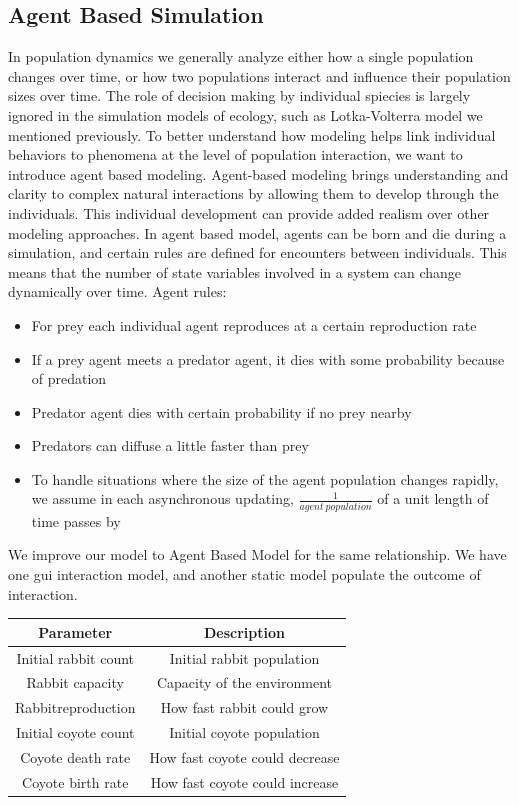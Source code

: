 \documentclass{article}
\begin{document}
\begin{normalsize}
		\subsection{Agent Based Simulation}
		In population dynamics we generally analyze either how a single population changes over time, or how two populations interact and influence their population sizes over time. The role of decision making by individual spiecies is largely ignored in the simulation models of ecology, such as Lotka-Volterra model we mentioned previously. To better understand how modeling helps link individual behaviors to phenomena at the level of population interaction, we want to  introduce agent based modeling.
		 Agent-based modeling brings understanding and clarity to complex natural interactions by allowing them to develop through the individuals. This individual development can provide added realism over other modeling approaches. In agent based model,
		agents can be born and die during a simulation, and certain rules are defined for encounters between individuals. This means that the number of state variables involved in a system can change dynamically over time.
		Agent rules:
		\begin{itemize}
		    \item For prey each individual agent reproduces at a certain reproduction rate
		    \item If a prey agent meets a predator agent, it dies with some probability because of predation
		    \item Predator agent  dies with certain probability if no prey nearby
		    \item Predators can diffuse a little faster than prey
		    \item To handle situations where the size of the agent population changes rapidly, we assume in each asynchronous updating,
$\frac{1}{agent\ population}$ of a unit length of time passes by
		\end{itemize}
		
		We improve our model to Agent Based Model for the same relationship. We have one gui interaction model, and another static model populate the outcome of interaction.
		
			\begin{center}
			\begin{tabular}{ |c|c|} 
				\hline
				Parameter & Description  \\ 
				\hline
				Initial rabbit count & Initial rabbit population  \\ 
				Rabbit capacity & Capacity of the environment\\ 
				Rabbitreproduction & How fast rabbit could grow \\ 
				Initial coyote count & Initial coyote population \\ 
				Coyote death rate & How fast coyote could decrease \\ 
				Coyote birth rate  & How fast coyote could increase \\ 
				\hline
			\end{tabular}
		\end{center}
	

\end{normalsize}
\end{document}
